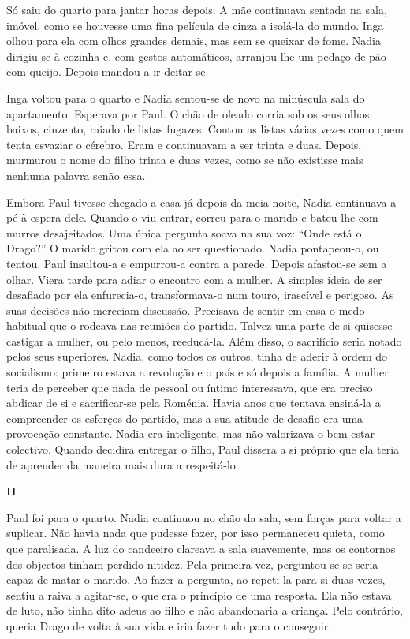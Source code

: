 Só saiu do quarto para jantar horas depois. A mãe continuava sentada
na sala, imóvel, como se houvesse uma fina película de cinza a isolá-la
do mundo. Inga olhou para ela com olhos grandes demais, mas sem se
queixar de fome. Nadia dirigiu-se à cozinha e, com gestos automáticos,
arranjou-lhe um pedaço de pão com queijo. Depois mandou-a ir deitar-se.

Inga voltou para o quarto e Nadia sentou-se de novo na minúscula sala do
apartamento. Esperava por Paul. O chão de oleado corria sob os seus
olhos baixos, cinzento, raiado de listas fugazes. Contou as listas
várias vezes como quem tenta esvaziar o cérebro. Eram e continuavam a
ser trinta e duas. Depois, murmurou o nome do filho trinta e duas vezes,
como se não existisse mais nenhuma palavra senão essa.

Embora Paul tivesse chegado a casa já depois da meia-noite, Nadia continuava a pé à espera dele. Quando o viu entrar, correu
para o marido e bateu-lhe com murros desajeitados. Uma única pergunta
soava na sua voz: ``Onde está o Drago?'' O marido gritou com ela ao ser
questionado. Nadia pontapeou-o, ou tentou. Paul insultou-a e
empurrou-a contra a parede. Depois afastou-se sem a olhar. Viera tarde
para adiar o encontro com a mulher. A simples ideia de ser desafiado por
ela enfurecia-o, transformava-o num touro, irascível e perigoso. As suas
decisões não mereciam discussão. Precisava de sentir em
casa o medo habitual que o rodeava nas reuniões do partido. Talvez uma
parte de si quisesse castigar a mulher, ou pelo menos, reeducá-la. Além
disso, o sacrifício seria notado pelos seus superiores. Nadia, como
todos os outros, tinha de aderir à ordem do socialismo: primeiro estava
a revolução e o país e só depois a família. A mulher teria de perceber
que nada de pessoal ou íntimo interessava, que era preciso abdicar de
si e sacrificar-se pela Roménia. Havia anos que tentava ensiná-la a
compreender os esforços do partido, mas a sua atitude de desafio era uma
provocação constante. Nadia era inteligente, mas não valorizava o
bem-estar colectivo. Quando decidira entregar o filho, Paul dissera a
si próprio que ela teria de aprender da maneira mais dura a
respeitá-lo.


\pagebreak
\vspace*{1.8cm}
\noindent{}\textbf{II}

\bigskip


Paul foi para o quarto. Nadia continuou no chão da sala, sem forças para
voltar a suplicar. Não havia nada que pudesse fazer, por isso permaneceu
quieta, como que paralisada. A luz do candeeiro clareava a sala
suavemente, mas os contornos dos objectos tinham perdido nitidez. Pela
primeira vez, perguntou-se se seria capaz de matar o marido. Ao fazer a
pergunta, ao repeti-la para si duas vezes, sentiu a raiva a agitar-se, o
que era o princípio de uma resposta. Ela não estava de luto, não tinha
dito adeus ao filho e não abandonaria a criança. Pelo contrário, queria
Drago de volta à sua vida e iria fazer tudo para o conseguir.

